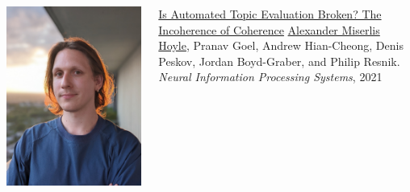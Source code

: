 \documentclass[compress]{beamer}
\begin{document}
\begin{frame}{}

  \begin{columns}
    \begin{center}
        \includegraphics[width=0.8\linewidth]{general_figures/alexander}
        \end{center}
    \begin{block}{\href{http://umiacs.umd.edu/~jbg//docs/2021_neurips_incoherence.pdf}{Is Automated Topic Evaluation Broken? The Incoherence of Coherence}}
      \href{https://alexanderhoyle.com/}{Alexander Miserlis Hoyle},
      Pranav Goel, Andrew Hian-Cheong, Denis Peskov, Jordan
      Boyd-Graber, and Philip Resnik.
      \emph{Neural Information Processing Systems}, 2021
        \end{block}

  \end{columns}
\end{frame}
\end{document}
